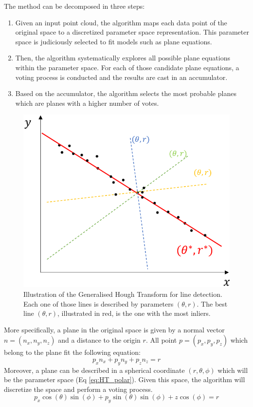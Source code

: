 \noindent The method can be decomposed in three steps:
\begin{enumerate}
    \item Given an input point cloud, the algorithm maps each data point of the original space to a discretized parameter space representation. This parameter space is judiciously selected to fit models such as plane equations.
    \item Then, the algorithm systematically explores all possible plane equations within the parameter space. For each of those candidate plane equations, a voting process is conducted and the results are cast in an accumulator.
    \item Based on the accumulator, the algorithm selects the most probable planes which are planes with a higher number of votes.
\end{enumerate}
\begin{figure}[ht]
    \centering
    \includegraphics[scale=0.8]{Img/03_GHT.png}
    \caption{Illustration of the Generalised Hough Transform for line detection. Each one of those lines is described by parameters $(\theta,r)$. The best line $(\theta, r)$, illustrated in red, is the one with the most inliers.}
\end{figure}
More specifically, a plane in the original space is given by a normal vector $n = (n_x,n_y,n_z)$ and a distance to the origin $r$. All point $p = (p_x, p_y, p_z) $ which belong to the plane fit the following equation:
\begin{equation}
    p_x n_x + p_y n_y + p_z n_z = r
\end{equation}
Moreover, a plane can be described in a spherical coordinate $(r, \theta,\phi)$ which will be the parameter space (Eq \ref{eq:HT_polar}). Given this space, the algorithm will discretize the space and perform a voting process.
\begin{equation}
    p_x \cos(\theta) \sin(\phi) + p_y \sin(\theta)\sin(\phi) + z \cos(\phi) = r
    \label{eq:HT_polar}
\end{equation}

